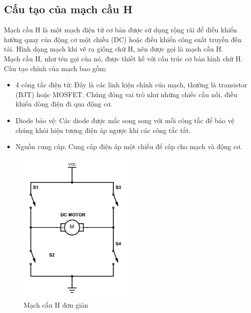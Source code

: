 \documentclass{article}
\begin{document}
\subsection{Cấu tạo của mạch cầu H}
Mạch cầu H là một mạch điện tử cơ bản được sử dụng rộng rãi để điều khiển hướng quay của động cơ một chiều (DC) hoặc điều khiển công suất truyền đến tải. Hình dạng mạch khi vẽ ra giống chữ H, nên được gọi là mạch cầu H.\\
Mạch cầu H, như tên gọi của nó, được thiết kế với cấu trúc cơ bản hình chữ H. Cấu tạo chính của mạch bao gồm: 
\vspace{-0.4cm}
\begin{itemize}
    \item 4 công tắc điện tử: Đây là các linh kiện chính của mạch, thường là transistor (BJT) hoặc MOSFET. Chúng đóng vai trò như những chiếc cầu nối, điều khiển dòng điện đi qua động cơ.
    \item Diode bảo vệ: Các diode được mắc song song với mỗi công tắc để bảo vệ chúng khỏi hiện tượng điện áp ngược khi các công tắc tắt.
    \item Nguồn cung cấp: Cung cấp điện áp một chiều để cấp cho mạch và động cơ.
\end{itemize}
\begin{figure}[H]
    \centering
    \includegraphics[width=0.5\textwidth]{image/cauhsimple.png}
    \caption{Mạch cầu H đơn giản}
    \label{fig:hbridge}
\end{figure}
\end{document}
